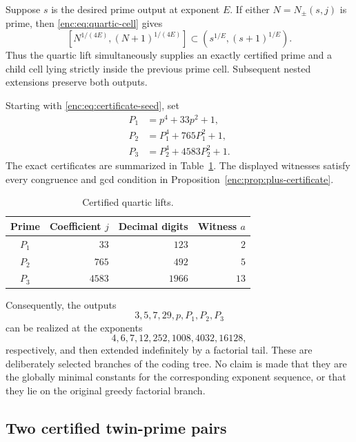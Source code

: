 \documentclass[11pt,a4paper]{article}
\theoremstyle{definition}
\theoremstyle{remark}
\numberwithin{equation}{section}
\begin{document}
Suppose $s$ is the desired prime output at exponent $E$.  If either
$N=N_\pm(s,j)$ is prime, then \eqref{enc:eq:quartic-cell} gives
\begin{equation}\label{enc:eq:quartic-root-cell}
\left[N^{1/(4E)},(N+1)^{1/(4E)}\right]
\subset\left(s^{1/E},(s+1)^{1/E}\right).
\end{equation}
Thus the quartic lift simultaneously supplies an exactly certified prime
and a child cell lying strictly inside the previous prime cell.
Subsequent nested extensions preserve both outputs.

Starting with \eqref{enc:eq:certificate-seed}, set
\begin{align*}
P_1&=p^4+33p^2+1,\\
P_2&=P_1^4+765P_1^2+1,\\
P_3&=P_2^4+4583P_2^2+1.
\end{align*}
The exact certificates are summarized in Table~\ref{enc:tab:prime-tower}.
The displayed witnesses satisfy every congruence and gcd condition in
Proposition~\ref{enc:prop:plus-certificate}.

\begin{table}[htbp]
\centering
\caption{Certified quartic lifts.}\label{enc:tab:prime-tower}
\begin{tabular}{c r r r}
\hline
Prime & Coefficient $j$ & Decimal digits & Witness $a$\\
\hline
$P_1$ & $33$ & $123$ & $2$\\
$P_2$ & $765$ & $492$ & $5$\\
$P_3$ & $4583$ & $1966$ & $13$\\
\hline
\end{tabular}
\end{table}

Consequently, the outputs
\[
3,5,7,29,p,P_1,P_2,P_3
\]
can be realized at the exponents
\[
4,6,7,12,252,1008,4032,16128,
\]
respectively, and then extended indefinitely by a factorial tail.
These are deliberately selected branches of the coding tree.
No claim is made that they are the globally minimal constants for the
corresponding exponent sequence, or that they lie on the original greedy
factorial branch.

\subsection{Two certified twin-prime pairs}
\end{document}
